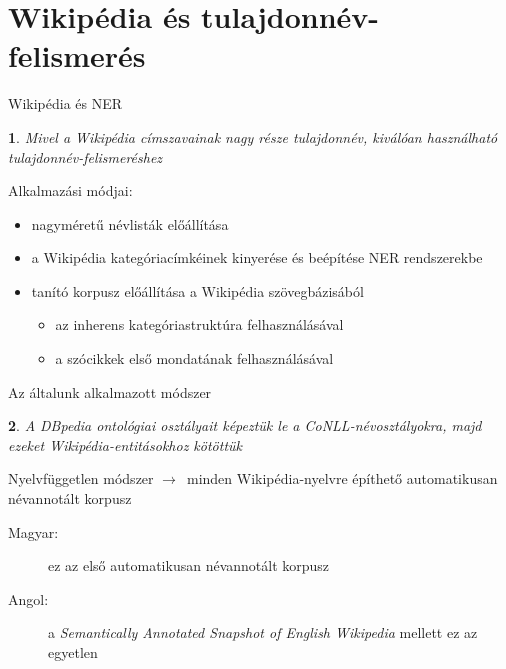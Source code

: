 \documentclass[utf8x,t]{beamer}
\newcommand{\nyil}{$\rightarrow$\ }
\newtheorem{nix}{}[section]
\begin{document}
\section{Wikipédia és tulajdonnév-felismerés}

\begin{frame}{Wikipédia és NER}

\bigskip

\begin{nix}
Mivel a Wikipédia címszavainak nagy része tulajdonnév, kiválóan használható tulajdonnév-felismeréshez
\end{nix}

\bigskip

Alkalmazási módjai:  %
\smallskip
  \begin{itemize}
  \item nagyméretű névlisták előállítása 
  \item a Wikipédia kategóriacímkéinek kinyerése és beépítése NER rendszerekbe
  \item tanító korpusz előállítása a Wikipédia szövegbázisából
    \begin{itemize}
    \item az inherens kategóriastruktúra felhasználásával
    \item a szócikkek első mondatának felhasználásával
    \end{itemize} 
  \end{itemize}

\end{frame}

\begin{frame}{Az általunk alkalmazott módszer}
\bigskip
\begin{nix}
A DBpedia ontológiai osztályait képeztük le a CoNLL-névosztályokra, majd ezeket Wikipédia-entitásokhoz kötöttük
\end{nix}

\bigskip

Nyelvfüggetlen módszer \nyil minden Wikipédia-nyelvre építhető automatikusan névannotált korpusz

\bigskip

\begin{description}
\item[Magyar:] ez az első automatikusan névannotált korpusz
\item[Angol:] a \textit{Semantically Annotated Snapshot of English Wikipedia} mellett ez az egyetlen
\end{description}

\end{frame}
\end{document}
